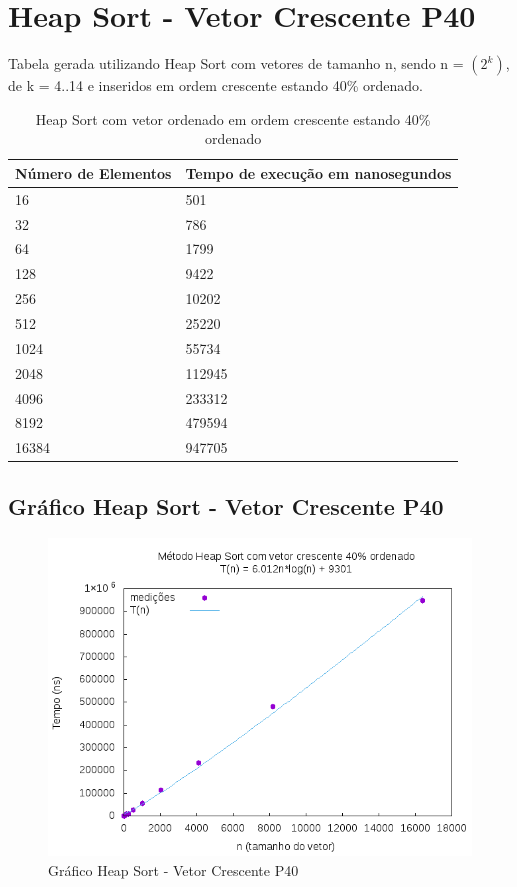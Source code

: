 \documentclass[12pt,a4paper,twoside]{report}
\begin{document}
\section{Heap Sort - Vetor Crescente P40}
Tabela gerada utilizando Heap Sort com vetores de tamanho n, sendo n = $(2^k)$, de k = 4..14 e inseridos em ordem crescente estando 40\% ordenado.
\begin{table}[H]
\centering
\caption{Heap Sort com vetor ordenado em ordem crescente estando 40\% ordenado}
\label{my-label}
\begin{tabular}{|l|l|}
\hline
\multicolumn{1}{|c|}{\textbf{Número de Elementos}} & \multicolumn{1}{c|}{\textbf{Tempo de execução em nanosegundos}} \\ \hline
16 & 501 \\ \hline
32 & 786 \\ \hline
64 & 1799 \\ \hline
128 & 9422 \\ \hline
256 & 10202 \\ \hline
512 & 25220 \\ \hline
1024 & 55734 \\ \hline
2048 & 112945 \\ \hline
4096 & 233312 \\ \hline
8192 & 479594 \\ \hline
16384 & 947705 \\ \hline
\end{tabular}
\end{table}

\subsection{Gráfico Heap Sort - Vetor Crescente P40}
\begin{figure}[H]
    \centering
    \includegraphics[width=0.7\linewidth]{graficos/HeapSort/vIntCrescenteP40/vIntCrescenteP40.png}
  \caption{Gráfico Heap Sort - Vetor Crescente P40}
\end{figure}
\end{document}
